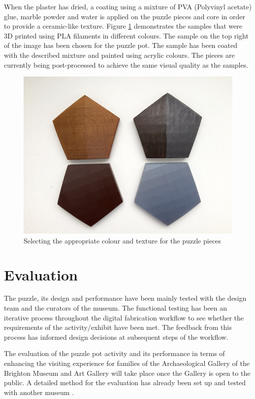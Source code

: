 \documentclass[acmlarge,screen]{acmart}
\begin{document}
When the plaster has dried, a coating using a mixture of PVA (Polyvinyl acetate) glue, marble powder and water is applied on the puzzle pieces and core in order to provide a ceramic-like texture. Figure \ref{fig:col} demonstrates the samples that were 3D printed using PLA filaments in different colours. The sample on the top right of the image has been chosen for the puzzle pot. The sample has been coated with the described mixture and painted using acrylic colours. The pieces are currently being post-processed to achieve the same visual quality as the samples. 

\begin{figure}[h]
  \centering
  \includegraphics[width=0.6\linewidth]{images/colours}
  \caption{\label{fig:col}
    Selecting the appropriate colour and texture for the puzzle pieces}
\end{figure}

\section{Evaluation}
\label{eva}
The puzzle, its design and performance have been mainly tested with the design team and the curators of the museum. The functional testing has been an iterative process throughout the digital fabrication workflow to see whether the requirements of the activity/exhibit have been met. The feedback from this process has informed design decisions at subsequent steps of the workflow.

The evaluation of the puzzle pot activity and its performance in terms of enhancing the visiting experience for families of the Archaeological Gallery of the Brighton Museum and Art Gallery will take place once the Gallery is open to the public. A detailed method for the evaluation has already been set up and tested with another museum \cite{Samaroudi2017}.
\end{document}
